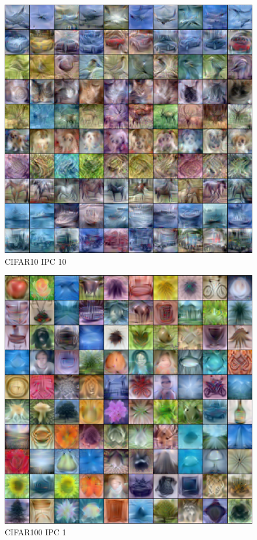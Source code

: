 \documentclass[10pt,twocolumn,letterpaper]{article}
\begin{document}
\newpage
\begin{figure}
    \centering
    \includegraphics[width=\textwidth]{images/appendix/cifar10_ipc10.png}
    \caption{CIFAR10 IPC 10}
\end{figure}
\begin{figure}
    \centering
    \includegraphics[width=\textwidth]{images/appendix/cifar-100.png}
    \caption{CIFAR100 IPC 1}
\end{figure}
\end{document}
